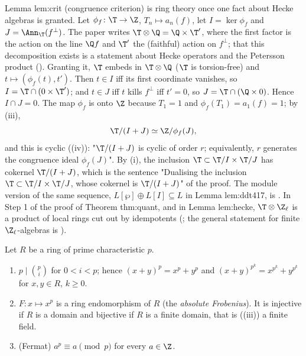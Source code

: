 \begin{paperlink}\label{pl:rings:crit}
Lemma lem:crit (congruence criterion) is ring theory once one fact about Hecke algebras is granted. Let
$\phi_f\colon\T\to\Z$, $T_n\mapsto a_n(f)$, let $I=\ker\phi_f$ and $J=\Ann_\T(f^\perp)$. The paper writes $\T\otimes\Q=\Q\times\T'$, where
the first factor is the action on the line $\Q f$ and $\T'$ the (faithful) action on $f^\perp$; that this decomposition exists is
a statement about Hecke operators and the Petersson product (). Granting it, $\T$ embeds in $\T\otimes\Q$
($\T$ is torsion-free) and $t\mapsto(\phi_f(t),t')$. Then $t\in I$ iff its first coordinate vanishes, so $I=\T\cap(0\times\T')$; and $t\in J$ iff
$t$ kills $f^\perp$ iff $t'=0$, so $J=\T\cap(\Q\times0)$. Hence $I\cap J=0$. The map $\phi_f$ is onto $\Z$ because $T_1=1$ and
$\phi_f(T_1)=a_1(f)=1$; by (iii),
\[
\T/(I+J)\simeq\Z/\phi_f(J),
\]
and this is cyclic ((iv)): "$\T/(I+J)$ is cyclic of order $r$; equivalently, $r$ generates the
congruence ideal $\phi_f(J)$". By (i), the inclusion $\T\subset\T/I\times\T/J$ has cokernel $\T/(I+J)$,
which is the sentence "Dualising the inclusion $\T\subset\T/I\times\T/J$, whose cokernel is $\T/(I+J)$" of the proof. The module
version of the same sequence, $L[\wp]\oplus L[I]\subseteq L$ in Lemma lem:ddt417, is . In Step 1 of the proof of
Theorem thm:quant, and in Lemma lem:hecke, $\T\otimes\Z_\ell$ is a product of local rings cut out by idempotents
(; the general statement for finite $\Z_\ell$-algebras is ).
\end{paperlink}

\begin{proposition}\label{prop:rings:freshman}
Let $R$ be a ring of prime characteristic $p$.
\begin{enumerate}[label=(\roman*)]
\item $p\mid\binom pi$ for $0<i<p$; hence $(x+y)^p=x^p+y^p$ and $(x+y)^{p^k}=x^{p^k}+y^{p^k}$ for $x,y\in R$, $k\ge0$.
\item $F\colon x\mapsto x^p$ is a ring endomorphism of $R$ (the \emph{absolute Frobenius}). It is injective if $R$ is a domain and
bijective if $R$ is a finite domain, that is ((iii)) a finite field.
\item (Fermat) $a^p\equiv a\pmod p$ for every $a\in\Z$.
\end{enumerate}
\end{proposition}

